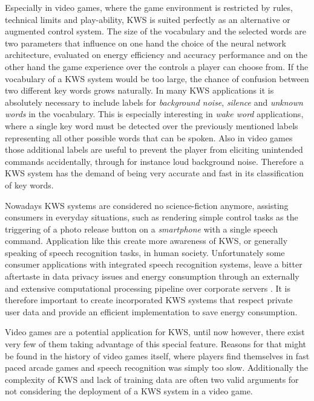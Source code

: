 Especially in video games, where the game environment is restricted by rules, technical limits and play-ability, KWS is suited perfectly as an alternative or augmented control system.
The size of the vocabulary and the selected words are two parameters that influence on one hand the choice of the neural network architecture, evaluated on energy efficiency and accuracy performance and on the other hand the game experience over the controls a player can choose from.
If the vocabulary of a KWS system would be too large, the chance of confusion between two different key words grows naturally.
In many KWS applications it is absolutely necessary to include labels for \emph{background noise}, \emph{silence} and \emph{unknown words} in the vocabulary. 
This is especially interesting in \emph{wake word} applications, where a single key word must be detected over the previously mentioned labels representing all other possible words that can be spoken.
Also in video games those additional labels are useful to prevent the player from eliciting unintended commands accidentally, through for instance loud background noise.
Therefore a KWS system has the demand of being very accurate and fast in its classification of key words.

Nowadays KWS systems are considered no science-fiction anymore, assisting consumers in everyday situations, such as rendering simple control tasks as the triggering of a photo release button on a \emph{smartphone} with a single speech command.
Application like this create more awareness of KWS, or generally speaking of speech recognition tasks, in human society.
Unfortunately some consumer applications with integrated speech recognition systems, leave a bitter aftertaste in data privacy issues and energy consumption through an externally and extensive computational processing pipeline over corporate servers \cite{Tang2018}.
It is therefore important to create incorporated KWS systems that respect private user data and provide an efficient implementation to save energy consumption.

Video games are a potential application for KWS, until now however, there exist very few of them taking advantage of this special feature.
Reasons for that might be found in the history of video games itself, where players find themselves in fast paced arcade games and speech recognition was simply too slow.
Additionally the complexity of KWS and lack of training data are often two valid arguments for not considering the deployment of a KWS system in a video game.

